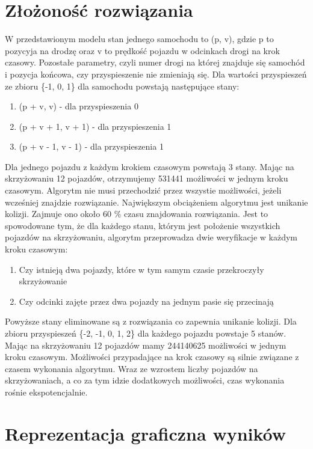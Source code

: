 \section{Złożoność rozwiązania}

W przedstawionym modelu stan jednego samochodu to (p, v), gdzie p to pozycyja na drodzę oraz v to prędkość pojazdu w odcinkach drogi na krok czasowy. Pozostałe parametry, czyli numer drogi na której znajduje się samochód i pozycja końcowa, czy przyspieszenie nie zmieniają się. Dla wartości przyspieszeń ze zbioru \{-1, 0, 1\} dla samochodu powstają następujące stany:
\begin{enumerate}
\item (p + v, v) - dla przyspieszenia 0
\item (p + v + 1, v + 1) - dla przyspieszenia 1
\item (p + v - 1, v - 1) - dla przyspieszenia 1
\end{enumerate}
Dla jednego pojazdu z każdym krokiem czasowym powstają 3 stany. Mając na skrzyżowaniu 12 pojazdów, otrzymujemy 531441 możliwości w jednym kroku czasowym. Algorytm nie musi przechodzić przez wszystie możliwości, jeżeli wcześniej znajdzie rozwiązanie.
\newline
\indent
Największym obciążeniem algorytmu jest unikanie kolizji. Zajmuje ono około 60 \% czasu znajdowania rozwiązania. Jest to spowodowane tym, że dla każdego stanu, którym jest położenie wszystkich pojazdów na skrzyżowaniu, algorytm przeprowadza dwie weryfikacje w każdym kroku czasowym:
\begin{enumerate}
\item Czy istnieją dwa pojazdy, które w tym samym czasie przekroczyły skrzyżowanie
\item Czy odcinki zajęte przez dwa pojazdy na jednym pasie się przecinają
\end{enumerate}
Powyższe stany eliminowane są z rozwiązania co zapewnia unikanie kolizji.
\newline
\indent
Dla zbioru przyspieszeń \{-2, -1, 0, 1, 2\} dla każdego pojazdu powstaje 5 stanów. Mając na skrzyżowaniu 12 pojazdów mamy 244140625 możliwości w jednym kroku czasowym. Możliwości przypadające na krok czasowy są silnie związane z czasem wykonania algorytmu. Wraz ze wzrostem liczby pojazdów na skrzyżowaniach, a co za tym idzie dodatkowych możliwości, czas wykonania rośnie ekspotencjalnie.
\section{Reprezentacja graficzna wyników}

